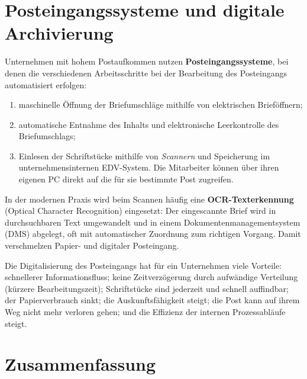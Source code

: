 \documentclass[11pt, a4paper]{article}
\begin{document}
\section{Posteingangssysteme und digitale Archivierung}

Unternehmen mit hohem Postaufkommen nutzen \textbf{Posteingangssysteme}, bei denen die
verschiedenen Arbeitsschritte bei der Bearbeitung des Posteingangs automatisiert erfolgen:

\begin{enumerate}
  \item maschinelle Öffnung der Briefumschläge mithilfe von elektrischen Brieföffnern;
  \item automatische Entnahme des Inhalts und elektronische Leerkontrolle des Briefumschlags;
  \item Einlesen der Schriftstücke mithilfe von \emph{Scannern} und Speicherung im
    unternehmensinternen EDV-System. Die Mitarbeiter können über ihren eigenen PC direkt auf
    die für sie bestimmte Post zugreifen.
\end{enumerate}

In der modernen Praxis wird beim Scannen häufig eine \textbf{OCR-Texterkennung} (Optical
Character Recognition) eingesetzt: Der eingescannte Brief wird in durchsuchbaren Text
umgewandelt und in einem Dokumentenmanagementsystem (DMS) abgelegt, oft mit automatischer
Zuordnung zum richtigen Vorgang. Damit verschmelzen Papier- und digitaler Posteingang.

\begin{merksatz}
Die Digitalisierung des Posteingangs hat für ein Unternehmen viele Vorteile: schnellerer
Informationsfluss; keine Zeitverzögerung durch aufwändige Verteilung (kürzere Bearbeitungszeit);
Schriftstücke sind jederzeit und schnell auffindbar; der Papierverbrauch sinkt; die
Auskunftsfähigkeit steigt; die Post kann auf ihrem Weg nicht mehr verloren gehen; und die
Effizienz der internen Prozessabläufe steigt.
\end{merksatz}

\section{Zusammenfassung}
\end{document}

